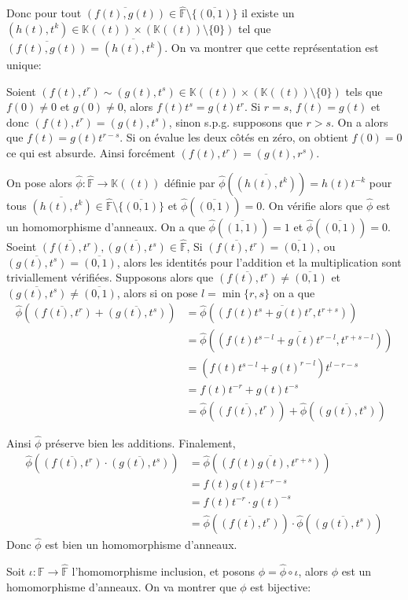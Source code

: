 \documentclass[french]{article}
\newcommand{\K}{\mathbb{K}}
\newcommand{\F}{\mathbb{F}}
\newcommand{\hF}{\hat{\F}}
\newcommand{\KKL}{\K((t))\times(\K((t))\setminus\{0\})}
\newcommand{\ol}{\overline}
\begin{document}
Donc pour tout $\ol{(f(t), g(t))} \in \hF \setminus \{\ol{(0, 1)}\}$
il existe un $(h(t), t^k) \in \KKL$ tel que
$\ol{(f(t), g(t))} = \ol{(h(t), t^k)}$. On va montrer que cette représentation
est unique:

Soient $(f(t), t^r) \sim (g(t), t^s) \in \KKL$ tels que
$f(0) \neq 0$ et $g(0) \neq 0$,
alors $f(t)t^s = g(t)t^r$.
Si $r = s$, $f(t) = g(t)$ et donc $(f(t), t^r) = (g(t), t^s)$, sinon s.p.g.
supposons que $r > s$. On a alors que $f(t) = g(t)t^{r-s}$.
Si on évalue les deux côtés en zéro, on obtient $f(0) = 0$ ce qui est absurde.
Ainsi forcément $(f(t), t^r) = (g(t), r^s)$.

On pose alors $\hat{\phi}: \hF \to \K((t))$ définie par 
$\hat{\phi}(\ol{(h(t), t^k)}) = h(t)t^{-k}$ pour tous
$\ol{(h(t), t^k)} \in \hF\setminus\{\ol{(0, 1)}\}$ et
$\hat{\phi}(\ol{(0, 1)}) = 0$. On vérifie alors que $\hat{\phi}$ est un
homomorphisme d'anneaux. On a que $\hat\phi (\ol{(1, 1)}) = 1$ et
$\hat\phi (\ol{(0, 1)}) = 0$. 
Soeint $\ol{(f(t), t^r)}, \ol{(g(t), t^s)} \in \hF$,
Si $\ol{(f(t), t^r)} = \ol{(0, 1)}$, ou 
$\ol{(g(t), t^s)} = \ol{(0, 1)}$, alors les identités pour l'addition et
la multiplication sont triviallement vérifiées. Supposons alors que
$\ol{(f(t), t^r)} \neq \ol{(0, 1)}$ et 
$\ol{(g(t), t^s)} \neq \ol{(0, 1)}$, alors si on pose 
$l = \min \{r, s\}$ on a que
\begin{align*}
	\hat\phi(\ol{(f(t), t^r)} + \ol{(g(t), t^s)}) &=
	\hat\phi(\ol{(f(t)t^s + g(t)t^r, t^{r + s})})\\
	&= \hat\phi(\ol{(f(t)t^{s - l} + g(t)t^{r - l}, t^{r + s - l})})\\
	&= (f(t)t^{s-l} + g(t)^{r-l})t^{l - r - s} \\
	&= f(t)t^{-r} + g(t)t^{-s} \\
	&= \hat\phi(\ol{(f(t), t^r)}) + \hat\phi(\ol{(g(t), t^s)})
\end{align*}

Ainsi $\hat\phi$ préserve bien les additions. Finalement,
\begin{align*}
	\hat\phi(\ol{(f(t), t^r)} \cdot \ol{(g(t), t^s)}) &=
	\hat\phi(\ol{(f(t)g(t), t^{r+s})}) \\
	&= f(t)g(t)t^{-r-s}\\
	&= f(t)t^{-r}\cdot g(t)^{-s}\\
	&= \hat\phi(\ol{(f(t), t^r)})\cdot \hat\phi(\ol{(g(t), t^s)})	
\end{align*}
Donc $\hat\phi$ est bien un homomorphisme d'anneaux.

Soit $\iota: \F \to \hF$ l'homomorphisme inclusion, et posons
$\phi = \hat\phi \circ \iota$, alors $\phi$ est un homomorphisme d'anneaux. On
va montrer que $\phi$ est bijective:
\end{document}
